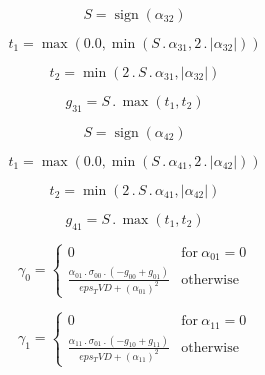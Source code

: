 \documentclass{article}
\begin{document}
\begin{dmath}S = \operatorname{sign}{\left (\alpha_{32} \right )}\end{dmath}

\begin{dmath}t_{1} = \max\left(0.0, \min\left(S \,.\, \alpha_{31}, 2 \,.\, \left|{\alpha_{32}}\right|\right)\right)\end{dmath}

\begin{dmath}t_{2} = \min\left(2 \,.\, S \,.\, \alpha_{31}, \left|{\alpha_{32}}\right|\right)\end{dmath}

\begin{dmath}g_{31} = S \,.\, \max\left(t_{1}, t_{2}\right)\end{dmath}

\begin{dmath}S = \operatorname{sign}{\left (\alpha_{42} \right )}\end{dmath}

\begin{dmath}t_{1} = \max\left(0.0, \min\left(S \,.\, \alpha_{41}, 2 \,.\, \left|{\alpha_{42}}\right|\right)\right)\end{dmath}

\begin{dmath}t_{2} = \min\left(2 \,.\, S \,.\, \alpha_{41}, \left|{\alpha_{42}}\right|\right)\end{dmath}

\begin{dmath}g_{41} = S \,.\, \max\left(t_{1}, t_{2}\right)\end{dmath}

\begin{dmath}\gamma_{0} = \begin{cases} 0 & \text{for}\: \alpha_{01} = 0 \\\frac{\alpha_{01} \,.\, \sigma_{0 0} \,.\, \left(- g_{00} + g_{01}\right)}{eps_TVD + \left(\alpha_{01} \right)^{2}} & \text{otherwise} \end{cases}\end{dmath}

\begin{dmath}\gamma_{1} = \begin{cases} 0 & \text{for}\: \alpha_{11} = 0 \\\frac{\alpha_{11} \,.\, \sigma_{0 1} \,.\, \left(- g_{10} + g_{11}\right)}{eps_TVD + \left(\alpha_{11} \right)^{2}} & \text{otherwise} \end{cases}\end{dmath}
\end{document}
